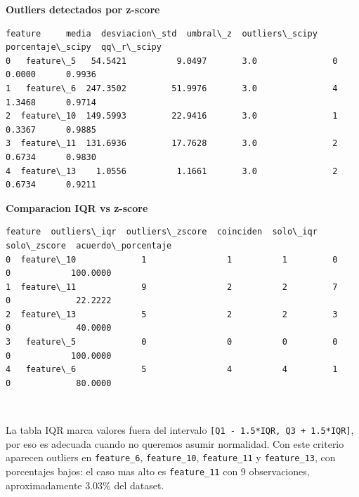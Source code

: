 \documentclass[11pt]{article}
\begin{document}
    
    \textbf{Outliers detectados por z-score}

    
    
    \begin{Verbatim}[commandchars=\\\{\}]
      feature     media  desviacion\_std  umbral\_z  outliers\_scipy  porcentaje\_scipy  qq\_r\_scipy
0   feature\_5   54.5421          9.0497       3.0               0            0.0000      0.9936
1   feature\_6  247.3502         51.9976       3.0               4            1.3468      0.9714
2  feature\_10  149.5993         22.9416       3.0               1            0.3367      0.9885
3  feature\_11  131.6936         17.7628       3.0               2            0.6734      0.9830
4  feature\_13    1.0556          1.1661       3.0               2            0.6734      0.9211
    \end{Verbatim}

    
    \textbf{Comparacion IQR vs z-score}

    
    
    \begin{Verbatim}[commandchars=\\\{\}]
      feature  outliers\_iqr  outliers\_zscore  coinciden  solo\_iqr  solo\_zscore  acuerdo\_porcentaje
0  feature\_10             1                1          1         0            0            100.0000
1  feature\_11             9                2          2         7            0             22.2222
2  feature\_13             5                2          2         3            0             40.0000
3   feature\_5             0                0          0         0            0            100.0000
4   feature\_6             5                4          4         1            0             80.0000
    \end{Verbatim}

    
    \begin{center}
    \end{center}
    { \hspace*{\fill} \\}
    
    La tabla IQR marca valores fuera del intervalo
\texttt{{[}Q1\ -\ 1.5*IQR,\ Q3\ +\ 1.5*IQR{]}}, por eso es adecuada
cuando no queremos asumir normalidad. Con este criterio aparecen
outliers en \texttt{feature\_6}, \texttt{feature\_10},
\texttt{feature\_11} y \texttt{feature\_13}, con porcentajes bajos: el
caso mas alto es \texttt{feature\_11} con 9 observaciones,
aproximadamente 3.03\% del dataset.
\end{document}
